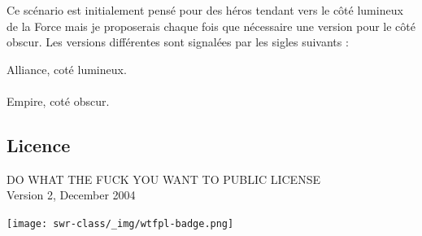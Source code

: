 \documentclass{jdrp}
\begin{document}
    \bigbreak

    Ce scénario est initialement pensé pour des héros tendant vers le côté lumineux de la Force mais je proposerais chaque fois que nécessaire une version pour le côté obscur. Les versions différentes sont signalées par les sigles suivants :

    \lettrine{\jedifont{\$}} Alliance, coté lumineux. 
    \\ \\ 
    \lettrine{\jedifont{\#}} Empire, coté obscur.
    \vspace*{\fill}

	\subsection{Licence}
	\noindent DO WHAT THE FUCK YOU WANT TO PUBLIC LICENSE\\
    Version 2, December 2004
    \vspace{-2.5\baselineskip}
	\begin{flushright}
		\texttt{[image: swr-class/\_img/wtfpl-badge.png]}
	\end{flushright}

	\twocolumn

	
    
    
    
    
	
	

	\onecolumn
	\nocite{*}
	\printbibliography[heading=bibintoc]
\end{document}

